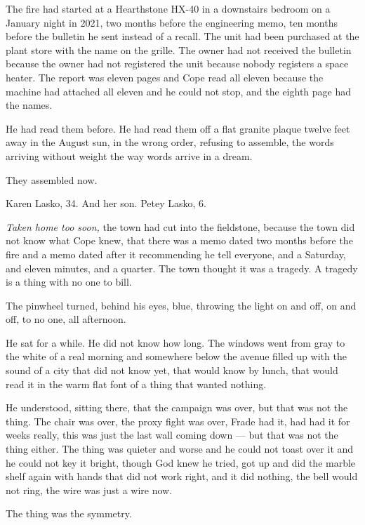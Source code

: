 \documentclass[11pt,openany]{book}
\newcommand{\scenebreak}{\par\vspace{0.5\baselineskip}\begin{center}\textasteriskcentered\quad\textasteriskcentered\quad\textasteriskcentered\end{center}\vspace{0.5\baselineskip}\par}
\begin{document}
The fire had started at a Hearthstone HX-40 in a downstairs bedroom on a January night in 2021, two months before the engineering memo, ten months before the bulletin he sent instead of a recall. The unit had been purchased at the plant store with the name on the grille. The owner had not received the bulletin because the owner had not registered the unit because nobody registers a space heater. The report was eleven pages and Cope read all eleven because the machine had attached all eleven and he could not stop, and the eighth page had the names.

He had read them before. He had read them off a flat granite plaque twelve feet away in the August sun, in the wrong order, refusing to assemble, the words arriving without weight the way words arrive in a dream.

They assembled now.

Karen Lasko, 34. And her son. Petey Lasko, 6.

\textit{Taken home too soon,} the town had cut into the fieldstone, because the town did not know what Cope knew, that there was a memo dated two months before the fire and a memo dated after it recommending he tell everyone, and a Saturday, and eleven minutes, and a quarter. The town thought it was a tragedy. A tragedy is a thing with no one to bill.

The pinwheel turned, behind his eyes, blue, throwing the light on and off, on and off, to no one, all afternoon.


\scenebreak


He sat for a while. He did not know how long. The windows went from gray to the white of a real morning and somewhere below the avenue filled up with the sound of a city that did not know yet, that would know by lunch, that would read it in the warm flat font of a thing that wanted nothing.

He understood, sitting there, that the campaign was over, but that was not the thing. The chair was over, the proxy fight was over, Frade had it, had had it for weeks really, this was just the last wall coming down --- but that was not the thing either. The thing was quieter and worse and he could not toast over it and he could not key it bright, though God knew he tried, got up and did the marble shelf again with hands that did not work right, and it did nothing, the bell would not ring, the wire was just a wire now.

The thing was the symmetry.
\end{document}
